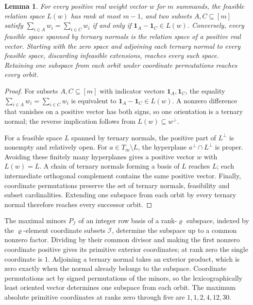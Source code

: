 \documentclass[11pt,a4paper]{article}
\numberwithin{equation}{section}
\newtheorem{lemma}[theorem]{Lemma}
\theoremstyle{remark}
\begin{document}
\begin{lemma}\label{lem:relations}
For every positive real weight vector $w$ for $m$ summands, the feasible relation space $L(w)$ has rank at most $m-1$, and two subsets $A,C\subseteq[m]$ satisfy $\sum_{i\in A}w_i=\sum_{i\in C}w_i$ if and only if $\mathbf 1_A-\mathbf 1_C\in L(w)$. Conversely, every feasible space spanned by ternary normals is the relation space of a positive real vector. Starting with the zero space and adjoining each ternary normal to every feasible space, discarding infeasible extensions, reaches every such space. Retaining one subspace from each orbit under coordinate permutations reaches every orbit.
\end{lemma}
\begin{proof}
For subsets $A,C\subseteq[m]$ with indicator vectors $\mathbf 1_A,\mathbf 1_C$, the equality $\sum_{i\in A}w_i=\sum_{i\in C}w_i$ is equivalent to $\mathbf 1_A-\mathbf 1_C\in L(w)$. A nonzero difference that vanishes on a positive vector has both signs, so one orientation is a ternary normal; the reverse implication follows from $L(w)\subseteq w^\perp$.

For a feasible space $L$ spanned by ternary normals, the positive part of $L^\perp$ is nonempty and relatively open. For $a\in T_m\setminus L$, the hyperplane $a^\perp\cap L^\perp$ is proper. Avoiding these finitely many hyperplanes gives a positive vector $w$ with $L(w)=L$. A chain of ternary normals forming a basis of $L$ reaches $L$; each intermediate orthogonal complement contains the same positive vector. Finally, coordinate permutations preserve the set of ternary normals, feasibility and subset cardinalities. Extending one subspace from each orbit by every ternary normal therefore reaches every successor orbit.
\end{proof}

The maximal minors $P_{\mathcal I}$ of an integer row basis of a rank-${\varrho}$ subspace, indexed by the ${\varrho}$-element coordinate subsets $\mathcal I$, determine the subspace up to a common nonzero factor. Dividing by their common divisor and making the first nonzero coordinate positive gives its primitive exterior coordinates; at rank zero the single coordinate is $1$. Adjoining a ternary normal takes an exterior product, which is zero exactly when the normal already belongs to the subspace. Coordinate permutations act by signed permutations of the minors, so the lexicographically least oriented vector determines one subspace from each orbit. The maximum absolute primitive coordinates at ranks zero through five are $1,1,2,4,12,30$.
\end{document}
